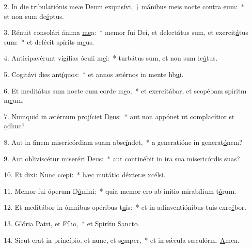 2. In die tribulatiónis meæ Deum exqui\uline{sí}vi,~† mánibus meis nocte contra \uline{e}um:~* et non sum dc\uline{é}ptus.\par 
3. Rénuit consolári ánima \uline{me}a:~† memor fui Dei, et delectátus sum, et exercit\uline{á}tus sum:~* et defécit spírits m\uline{e}us.\par 
4. Anticipavérunt vigílias óculi m\uline{e}i:~* turbátus sum, et non sum lc\uline{ú}tus.\par 
5. Cogitávi dies ant\uline{í}quos:~* et annos ætérnos in mente hb\uline{u}i.\par 
6. Et meditátus sum nocte cum corde m\uline{e}o,~* et exercitábar, et scopébam spíritm m\uline{e}um.\par 
7. Numquid in ætérnum projíciet D\uline{e}us:~* aut non appónet ut complacítior st \uline{a}dhuc?\par 
8. Aut in finem misericórdiam suam absc\uline{í}ndet,~* a generatióne in generat\uline{ó}nem?\par 
9. Aut obliviscétur miseréri D\uline{e}us:~* aut continébit in ira sua misericórdis s\uline{u}as?\par 
10. Et dixi: Nunc c\uline{œ}pi:~* hæc mutátio déxteræ xc\uline{é}lsi.\par 
11. Memor fui óperum D\uline{ó}mini:~* quia memor ero ab inítio mirabílium t\uline{ó}rum.\par 
12. Et meditábor in ómnibus opéribus t\uline{u}is:~* et in adinventiónibus tuis exrc\uline{é}bor.\par 
13. Glória Patri, et F\uline{í}lio,~* et Spirítu S\uline{a}ncto.\par 
14. Sicut erat in princípio, et nunc, et s\uline{e}mper,~* et in sǽcula sæculórm. \uline{A}men.\par 
